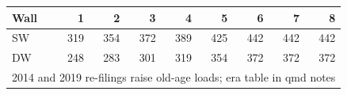 \begin{tabular}{lrrrrrrrr}
\toprule
Wall & 1 & 2 & 3 & 4 & 5 & 6 & 7 & 8 \\
\midrule
SW & 319 & 354 & 372 & 389 & 425 & 442 & 442 & 442 \\
DW & 248 & 283 & 301 & 319 & 354 & 372 & 372 & 372 \\
\midrule
\multicolumn{9}{l}{2014 and 2019 re-filings raise old-age loads; era table in qmd notes} \\
\bottomrule
\end{tabular}
